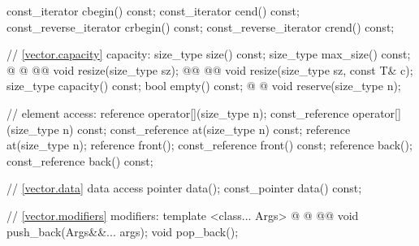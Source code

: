 \documentclass[american,twoside]{book}
\begin{document}
\begin{codeblock}
{{    const_iterator         cbegin() const;
    const_iterator         cend() const;
    const_reverse_iterator crbegin() const;
    const_reverse_iterator crend() const;

    // \ref{vector.capacity} capacity:
    size_type size() const;
    size_type max_size() const;
    @ @ 
             @@
      void resize(size_type sz);
    @@ @@
      void resize(size_type sz, const T& c);
    size_type capacity() const;
    bool      empty() const;
    @ @ void reserve(size_type n);

    // element access:
    reference       operator[](size_type n);
    const_reference operator[](size_type n) const;
    const_reference at(size_type n) const;
    reference       at(size_type n);
    reference       front();
    const_reference front() const;
    reference       back();
    const_reference back() const;

    // \ref{vector.data} data access
    pointer         data();
    const_pointer   data() const;

    // \ref{vector.modifiers} modifiers:
    template <class... Args> 
      @ @
            @@
      void push_back(Args&&... args);
    void pop_back();

}}
\end{codeblock}
\end{document}
